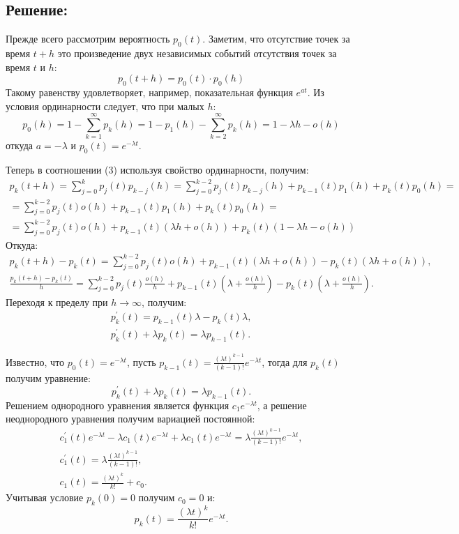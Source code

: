 \documentclass[12pt]{article}
\begin{document}
    \subsection*{Решение:}
    Прежде всего рассмотрим вероятность $p_0(t)$. Заметим, что отсутствие точек за время $t+h$ это произведение двух независимых событий отсутствия точек за время $t$ и $h$:
    \[
        p_0(t + h) = p_0(t) \cdot p_0(h)
    \]
    Такому равенству удовлетворяет, например, показательная функция $e^{a t}$. Из условия ординарности следует, что при малых $h$:
    \[
        p_0(h)
        = 1 - \sum_{k=1}^\infty p_k(h)
        = 1 - p_1(h) - \sum_{k=2}^\infty p_k(h)
        = 1 - \lambda h - o(h)
    \]
    откуда $a = -\lambda$ и $p_0(t) = e^{- \lambda t}$.

    Теперь в соотношении (3) используя свойство ординарности, получим:
    \begin{multline*}
        p_k(t+h)
        = \sum_{j=0}^k p_j(t) p_{k-j}(h)
        = \sum_{j=0}^{k-2} p_j(t) p_{k-j}(h) + p_{k-1}(t) p_1(h) + p_k(t) p_0(h) = \\
        = \sum_{j=0}^{k-2} p_j(t) o(h) + p_{k-1}(t) p_1(h) + p_k(t) p_0(h) = \\
        = \sum_{j=0}^{k-2} p_j(t) o(h) + p_{k-1}(t) \left ( \lambda h + o(h) \right ) + p_k(t) \left ( 1 - \lambda h - o(h) \right )
    \end{multline*}
    Откуда:
    \begin{gather*}
        p_k(t+h) - p_k(t) = \sum_{j=0}^{k-2} p_j(t) o(h) + p_{k-1}(t) \left ( \lambda h + o(h) \right ) - p_k(t) \left ( \lambda h + o(h) \right ) , \\
        \frac{p_k(t+h) - p_k(t)}{h} = \sum_{j=0}^{k-2} p_j(t) \frac{o(h)}{h} + p_{k-1}(t) \left ( \lambda + \frac{o(h)}{h} \right ) - p_k(t) \left ( \lambda + \frac{o(h)}{h} \right ).
    \end{gather*}
    Переходя к пределу при $h \rightarrow \infty$, получим:
    \begin{gather*}
        p_k^\prime(t) = p_{k-1}(t) \lambda - p_k(t) \lambda , \\
        p_k^\prime(t) + \lambda p_k(t) = \lambda p_{k-1}(t).
    \end{gather*}

    Известно, что $p_0(t) = e^{- \lambda t}$, пусть $p_{k-1}(t) = \frac{(\lambda t)^{k-1}}{(k-1)!} e^{-\lambda t}$, тогда для $p_k(t)$ получим уравнение:
    \[
        p_k^\prime(t) + \lambda p_k(t) = \lambda p_{k-1}(t).
    \]
    Решением однородного уравнения является функция $c_1 e^{-\lambda t}$, а решение неоднородного уравнения получим вариацией постоянной:
    \begin{gather*}
        c_1^\prime(t) e^{- \lambda t} - \lambda c_1(t) e^{- \lambda t} + \lambda c_1(t) e^{- \lambda t} = \lambda \frac{(\lambda t)^{k-1}}{(k-1)!} e^{-\lambda t} , \\
        c_1^\prime(t) = \lambda \frac{(\lambda t)^{k-1}}{(k-1)!} , \\
        c_1(t) = \frac{(\lambda t)^{k}}{k!} + c_0 .
    \end{gather*}
    Учитывая условие $p_k(0) = 0$ получим $c_0 = 0$ и:
    \[
        p_k(t) = \frac{(\lambda t)^{k}}{k!} e^{- \lambda t}.
    \]
\end{document}
